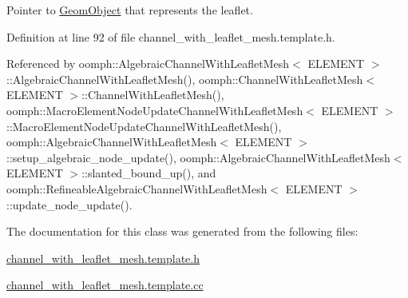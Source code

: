Pointer to \hyperlink{classoomph_1_1GeomObject}{Geom\+Object} that represents the leaflet. 



Definition at line 92 of file channel\+\_\+with\+\_\+leaflet\+\_\+mesh.\+template.\+h.



Referenced by oomph\+::\+Algebraic\+Channel\+With\+Leaflet\+Mesh$<$ E\+L\+E\+M\+E\+N\+T $>$\+::\+Algebraic\+Channel\+With\+Leaflet\+Mesh(), oomph\+::\+Channel\+With\+Leaflet\+Mesh$<$ E\+L\+E\+M\+E\+N\+T $>$\+::\+Channel\+With\+Leaflet\+Mesh(), oomph\+::\+Macro\+Element\+Node\+Update\+Channel\+With\+Leaflet\+Mesh$<$ E\+L\+E\+M\+E\+N\+T $>$\+::\+Macro\+Element\+Node\+Update\+Channel\+With\+Leaflet\+Mesh(), oomph\+::\+Algebraic\+Channel\+With\+Leaflet\+Mesh$<$ E\+L\+E\+M\+E\+N\+T $>$\+::setup\+\_\+algebraic\+\_\+node\+\_\+update(), oomph\+::\+Algebraic\+Channel\+With\+Leaflet\+Mesh$<$ E\+L\+E\+M\+E\+N\+T $>$\+::slanted\+\_\+bound\+\_\+up(), and oomph\+::\+Refineable\+Algebraic\+Channel\+With\+Leaflet\+Mesh$<$ E\+L\+E\+M\+E\+N\+T $>$\+::update\+\_\+node\+\_\+update().



The documentation for this class was generated from the following files\+:\begin{DoxyCompactItemize}
\item 
\hyperlink{channel__with__leaflet__mesh_8template_8h}{channel\+\_\+with\+\_\+leaflet\+\_\+mesh.\+template.\+h}\item 
\hyperlink{channel__with__leaflet__mesh_8template_8cc}{channel\+\_\+with\+\_\+leaflet\+\_\+mesh.\+template.\+cc}\end{DoxyCompactItemize}
